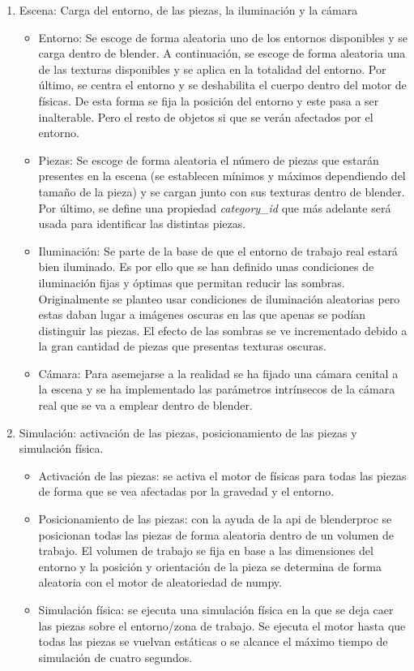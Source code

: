 \begin{enumerate}
\item Escena: Carga del entorno, de las piezas, la iluminación y la cámara
\begin{itemize}
\item Entorno: Se escoge de forma aleatoria uno de los entornos disponibles y se carga dentro de blender. A continuación, se escoge de forma aleatoria una de las texturas disponibles y se aplica en la totalidad del entorno. Por último, se centra el entorno y se deshabilita el cuerpo dentro del motor de físicas. De esta forma se fija la posición del entorno y este pasa a ser inalterable. Pero el resto de objetos si que se verán afectados por el entorno.

\item Piezas: Se escoge de forma aleatoria el número de piezas que estarán presentes en la escena (se establecen mínimos y máximos dependiendo del tamaño de la pieza) y se cargan junto con sus texturas dentro de blender. Por último, se define una propiedad \textit{category\_id} que más adelante será usada para identificar las distintas piezas.

\item Iluminación: Se parte de la base de que el entorno de trabajo real estará bien iluminado. Es por ello que se han definido unas condiciones de iluminación fijas y óptimas que permitan reducir las sombras. Originalmente se planteo usar condiciones de iluminación aleatorias pero estas daban lugar a imágenes oscuras en las que apenas se podían distinguir las piezas. El efecto de las sombras se ve incrementado debido a la gran cantidad de piezas que presentas texturas oscuras.

\item Cámara: Para asemejarse a la realidad se ha fijado una cámara cenital a la escena y se ha implementado las parámetros intrínsecos de la cámara real que se va a emplear dentro de blender.
\end{itemize}

\item Simulación: activación de las piezas, posicionamiento de las piezas y simulación física.
\begin{itemize}
\item Activación de las piezas: se activa el motor de físicas para todas las piezas de forma que se vea afectadas por la gravedad y el entorno.
\item Posicionamiento de las piezas: con la ayuda de la \acs{api} de blenderproc se posicionan todas las piezas de forma aleatoria dentro de un volumen de trabajo. El volumen de trabajo se fija en base a las dimensiones del entorno y la posición y orientación de la pieza se determina de forma aleatoria con el motor de aleatoriedad de numpy.
\item Simulación física: se ejecuta una simulación física en la que se deja caer las piezas sobre el entorno/zona de trabajo. Se ejecuta el motor hasta que todas las piezas se vuelvan estáticas o se alcance el máximo tiempo de simulación de cuatro segundos.
\end{itemize}


\end{enumerate}
